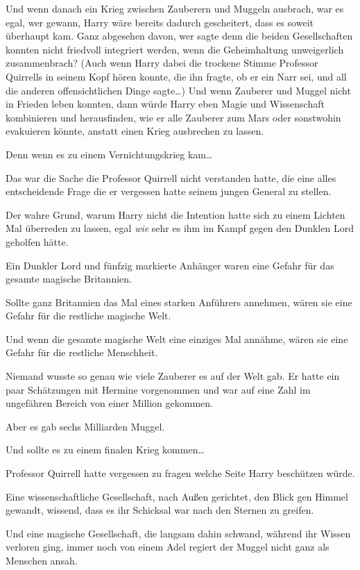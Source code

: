 {Und wenn danach ein Krieg zwischen Zauberern und Muggeln ausbrach, war es egal, wer gewann, Harry wäre bereits dadurch gescheitert, dass es soweit überhaupt kam. Ganz abgesehen davon, wer sagte denn die beiden Gesellschaften konnten nicht friedvoll integriert werden, wenn die Geheimhaltung unweigerlich zusammenbrach? (Auch wenn Harry dabei die trockene Stimme Professor Quirrells in seinem Kopf hören konnte, die ihn fragte, ob er ein Narr sei, und all die anderen offensichtlichen Dinge sagte…) Und wenn Zauberer und Muggel nicht in Frieden leben konnten, dann würde Harry eben Magie und Wissenschaft kombinieren und herausfinden, wie er alle Zauberer zum Mars oder sonstwohin evakuieren könnte, anstatt einen Krieg ausbrechen zu lassen.

Denn wenn es zu einem Vernichtungskrieg kam…

Das war die Sache die Professor Quirrell nicht verstanden hatte, die eine alles entscheidende Frage die er vergessen hatte seinem jungen General zu stellen.

Der wahre Grund, warum Harry nicht die Intention hatte sich zu einem Lichten Mal überreden zu lassen, egal \emph{wie} sehr es ihm im Kampf gegen den Dunklen Lord geholfen hätte.

Ein Dunkler Lord und fünfzig markierte Anhänger waren eine Gefahr für das gesamte magische Britannien.

Sollte ganz Britannien das Mal eines starken Anführers annehmen, wären sie eine Gefahr für die restliche magische Welt.

Und wenn die gesamte magische Welt eine einziges Mal annähme, wären sie eine Gefahr für die restliche Menschheit.

Niemand wusste so genau wie viele Zauberer es auf der Welt gab. Er hatte ein paar Schätzungen mit Hermine vorgenommen und war auf eine Zahl im ungefähren Bereich von einer Million gekommen.

Aber es gab sechs Milliarden Muggel.

Und sollte es zu einem finalen Krieg kommen…

Professor Quirrell hatte vergessen zu fragen welche Seite Harry beschützen würde.

Eine wissenschaftliche Gesellschaft, nach Außen gerichtet, den Blick gen Himmel gewandt, wissend, dass es ihr Schicksal war nach den Sternen zu greifen.

Und eine magische Gesellschaft, die langsam dahin schwand, während ihr Wissen verloren ging, immer noch von einem Adel regiert der Muggel nicht ganz als Menschen ansah.

}
